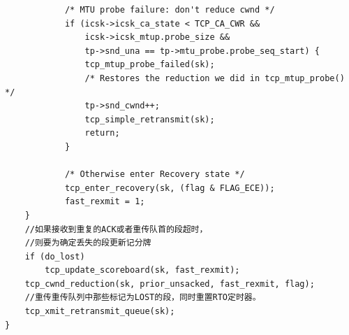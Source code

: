 \begin{verbatim}
			/* MTU probe failure: don't reduce cwnd */
			if (icsk->icsk_ca_state < TCP_CA_CWR &&
				icsk->icsk_mtup.probe_size &&
				tp->snd_una == tp->mtu_probe.probe_seq_start) {
				tcp_mtup_probe_failed(sk);
				/* Restores the reduction we did in tcp_mtup_probe() */
				tp->snd_cwnd++;
				tcp_simple_retransmit(sk);
				return;
			}

			/* Otherwise enter Recovery state */
			tcp_enter_recovery(sk, (flag & FLAG_ECE));
			fast_rexmit = 1;
	}
	//如果接收到重复的ACK或者重传队首的段超时，
	//则要为确定丢失的段更新记分牌
	if (do_lost)
		tcp_update_scoreboard(sk, fast_rexmit);
	tcp_cwnd_reduction(sk, prior_unsacked, fast_rexmit, flag);
	//重传重传队列中那些标记为LOST的段，同时重置RTO定时器。	
	tcp_xmit_retransmit_queue(sk);
}

\end{verbatim}
